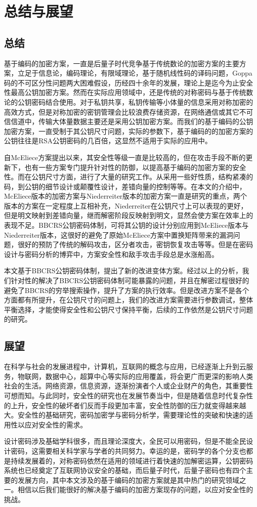 \chapter{总结与展望}
\section{总结}
基于编码的加密方案，一直是后量子时代竞争基于传统数论的加密方案的主要方案，立足于信息论，编码理论，有限域理论，基于随机线性码的译码问题，Goppa码的不可区分性问题两大困难假设，历经四十余年的发展，理论上是迄今为止安全性最高公钥加密方案。然而在实际应用领域中，还是传统的对称密码与基于传统数论的公钥密码结合使用。对于私钥共享，私钥传输等小体量的信息采用对称加密的高效方式，但是对称加密的密钥管理会比较浪费存储资源，在网络通信或其它不可信信道中，传输大体量数据主要还是采用公钥加密方案。而我们的基于编码的公钥加密方案，一直受制于其公钥尺寸问题，实际的参数下，基于编码的的加密方案的公钥往往是RSA公钥密码的几百倍，这显然不适用于实际的应用中。


自McEliece方案提出以来，其安全性等级一直是比较高的，但在攻击手段不断的更新下，也有一些方案专门提升针对性的防御，以提高基于编码的加密方案的安全性。而在公钥尺寸方面，进行了大量的研究工作。从采用一些好性质，结构紧凑的码，到公钥的细节设计或颠覆性设计，差错向量的控制等等。在本文的介绍中，McEliece版本的加密方案与Niederreiter版本的加密方案一直是研究的重点，两个版本的方案在一定程度上互相补充，Niederreiter在公钥尺寸上可以表现的更好，但是明文映射到差错向量，继而解密阶段反映射到明文，显然会使方案在效率上的表现不足。BBCRS公钥密码体制，可将其公钥的设计分别应用到McEliece版本与Niederreiter版本，这很好的避免了原始McEliece方案中置换矩阵带来的漏洞问题，很好的预防了传统的解码攻击，区分者攻击，密钥恢复攻击等等。但是在密码设计与密码分析的博弈中，方案安全性和敌手攻击手段总是水涨船高。

本文基于BBCRS公钥密码体制，提出了新的改进变体方案。经过以上的分析，我们针对性的解决了BBCRS公钥密码体制可能暴露的问题，并且在解密过程很好的避免了BBCRS的穷举搜索操作，提升了方案的执行效率。但是改进方案不是各个方面都有所提升，在公钥尺寸的问题上，我们的改进方案需要进行参数调试，整体平衡选择，才能使得安全性和公钥尺寸保持平衡，后续的工作依然是公钥尺寸问题的研究。

\section{展望}
在科学与社会的发展进程中，计算机，互联网的概念与应用，已经逐渐上升到云服务，物联网，数据中心，超算中心等实际的应用覆盖，将会更广而更深的影响人类社会的生活。网络资源，信息资源，逐渐扮演者个人或企业财产的角色，其重要性可想而知。与此同时，安全性的研究也在发展节奏当中，但是随着信息时代复杂性的上升，安全性的破坏者们反而手段更加丰富，安全性防御的压力就变得越来越大。安全性的基础研究，密码加密学与密码分析学，需要理论性的突破和快速的适用性以应对安全性的需求。

设计密码涉及基础学科很多，而且理论深度大，全民可以用密码，但是不能全民设计密码，这需要相关科学家与学者的共同努力。幸运的是，密码学的各个分支也都是持续发展着的，对称密码依然在适用的领域进行着快速的加解密运算，公钥密码系统也已经奠定了互联网协议安全的基础，而后量子时代，后量子密码也有四个主要的发展方向，其中本文涉及的基于编码的加密方案就是其中热门的研究领域之一。相信以后我们能很好的解决基于编码的加密方案现存的问题，以应对安全性的挑战。